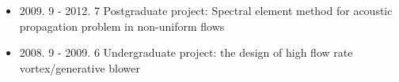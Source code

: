 \documentclass[letterpaper]{article}
\begin{document}
\begin{itemize}
\begin{itemize}
%					
%		
		\end{itemize}
		
\item 2009. 9 - 2012. 7  \hspace{2pt} Postgraduate project: Spectral element method for acoustic propagation problem in non-uniform flows

\item 2008. 9 - 2009. 6  \hspace{2pt} Undergraduate project: the design of high flow rate vortex/generative blower
		
\end{itemize}
\end{document}
